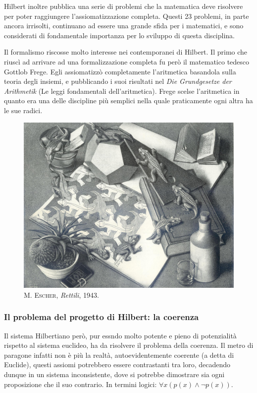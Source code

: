 \documentclass[a4paper,10pt]{article}
\begin{document}
Hilbert inoltre pubblica una serie di problemi che la matematica deve risolvere per poter raggiungere l'assiomatizzazione completa. Questi 23 problemi, in parte ancora irrisolti, continuano ad essere una grande sfida per i matematici, e sono considerati di fondamentale importanza per lo sviluppo di questa disciplina.

Il formalismo riscosse molto interesse nei contemporanei di Hilbert. Il primo che riuscì ad arrivare ad una formalizzazione completa fu però il matematico tedesco Gottlob Frege. Egli assiomatizzò completamente l'aritmetica basandola sulla teoria degli insiemi, e pubblicando i suoi risultati nel \textit{Die Grundgesetze der Arithmetik} (Le leggi fondamentali dell'aritmetica). Frege scelse l'aritmetica in quanto era una delle discipline più semplici nella quale praticamente ogni altra ha le sue radici.

\begin{figure}[b!]
 \begin{center}
  \includegraphics[width=\textwidth,keepaspectratio=true]{./pics/98210399zbOcyG_fs.jpg}  
 \end{center}
 \caption{\textsc{M. Escher}, \textit{Rettili}, 1943.}
\end{figure}

\subsubsection[Il problema coerenza]{Il problema del progetto di Hilbert: la coerenza}
Il sistema Hilbertiano però, pur essndo molto potente e pieno di potenzialità rispetto al sistema euclideo, ha da risolvere il problema della coerenza. Il metro di paragone infatti non è più la realtà, autoevidentemente coerente (a detta di Euclide), questi assiomi potrebbero essere contrastanti tra loro, decadendo dunque in un sistema inconsistente, dove si potrebbe dimostrare sia ogni proposizione che il suo contrario. In termini logici: $ \forall x (p(x)\wedge\neg p(x))$.
\end{document}

